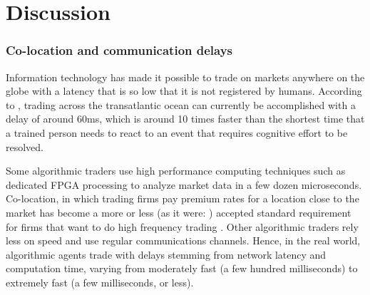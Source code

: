 \part{Discussion}\label{chapter:discussion}












\section{Co-location and communication delays}
Information technology has made it possible to trade on markets anywhere on the globe with a latency that is so low that it is not registered by humans. According to \cite{golub2012high}, trading across the transatlantic ocean can currently be accomplished with a delay of around 60ms, which is around 10 times faster than the shortest time that a trained person needs to react to an event that requires cognitive effort to be resolved. 

Some algorithmic traders use high performance computing techniques such as dedicated FPGA processing \cite{morris2009fpga} to analyze market data in a few dozen microseconds. Co-location, in which trading firms pay premium rates for a location close to the market has become a more or less (as it were: \cite{najarian2013hft}) accepted standard requirement for firms that want to do high frequency trading \cite{jeffs2010colocation, brogaard2013trading, rogow2012colocation}. Other algorithmic traders rely less on speed and use regular communications channels. Hence, in the real world, algorithmic agents trade with delays stemming from network latency and computation time, varying from moderately fast (a few hundred milliseconds) to extremely fast (a few milliseconds, or less).

